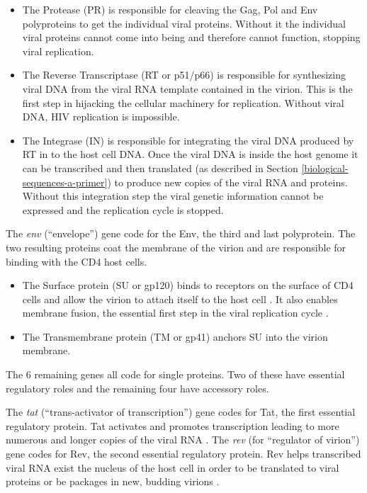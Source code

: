 \documentclass[
  11pt,
  twoside]{scrbook}
\begin{document}
\begin{itemize}
\item
  The Protease (PR) is responsible for cleaving the Gag, Pol and Env polyproteins to get the individual viral proteins. Without it the individual viral proteins cannot come into being and therefore cannot function, stopping viral replication.
\item
  The Reverse Transcriptase (RT or p51/p66) is responsible for synthesizing viral DNA from the viral RNA template contained in the virion. This is the first step in hijacking the cellular machinery for replication. Without viral DNA, HIV replication is impossible.
\item
  The Integrase (IN) is responsible for integrating the viral DNA produced by RT in to the host cell DNA. Once the viral DNA is inside the host genome it can be transcribed and then translated (as described in Section \ref{biological-sequences-a-primer}) to produce new copies of the viral RNA and proteins. Without this integration step the viral genetic information cannot be expressed and the replication cycle is stopped.
\end{itemize}

The \emph{env} (``envelope'') gene code for the Env, the third and last polyprotein. The two resulting proteins coat the membrane of the virion and are responsible for binding with the CD4 host cells.

\begin{itemize}
\item
  The Surface protein (SU or gp120) binds to receptors on the surface of CD4 cells and allow the virion to attach itself to the host cell \autocite{bourHumanImmunodeficiencyVirus1995}. It also enables membrane fusion, the essential first step in the viral replication cycle \autocite{hernandezViruscellCellcellFusion1996}.
\item
  The Transmembrane protein (TM or gp41) anchors SU into the virion membrane.
\end{itemize}

The 6 remaining genes all code for single proteins. Two of these have essential regulatory roles and the remaining four have accessory roles.

The \emph{tat} (``trans-activator of transcription'') gene codes for Tat, the first essential regulatory protein. Tat activates and promotes transcription leading to more numerous and longer copies of the viral RNA \autocite{jonesControlRnaInitiation1994}. The \emph{rev} (for ``regulator of virion'') gene codes for Rev, the second essential regulatory protein. Rev helps transcribed viral RNA exist the nucleus of the host cell in order to be translated to viral proteins or be packages in new, budding virions \autocite{hopeViralRNAExport1997}.
\end{document}
